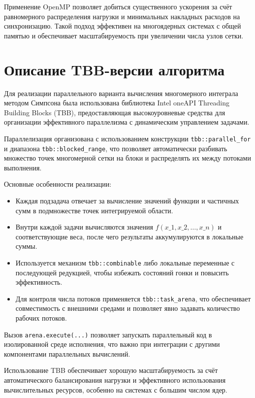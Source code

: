 \documentclass[14pt,a4paper]{extarticle}
\begin{document}
Применение OpenMP позволяет добиться существенного ускорения за счёт равномерного распределения нагрузки и минимальных накладных расходов на синхронизацию. Такой подход эффективен на многоядерных системах с общей памятью и обеспечивает масштабируемость при увеличении числа узлов сетки.


\section{Описание TBB-версии алгоритма}

Для реализации параллельного варианта вычисления многомерного интеграла методом Симпсона была использована библиотека Intel oneAPI Threading Building Blocks (TBB), предоставляющая высокоуровневые средства для организации эффективного параллелизма с динамическим управлением задачами.

Параллелизация организована с использованием конструкции \texttt{tbb::parallel\_for} и диапазона \texttt{tbb::blocked\_range}, что позволяет автоматически разбивать множество точек многомерной сетки на блоки и распределять их между потоками выполнения.

Основные особенности реализации:

\begin{itemize}
    \item Каждая подзадача отвечает за вычисление значений функции и частичных сумм в подмножестве точек интегрируемой области.
    
    \item Внутри каждой задачи вычисляются значения $f(x\_1, x\_2, \dots, x\_n)$ и соответствующие веса, после чего результаты аккумулируются в локальные суммы.
    
    \item Используется механизм \texttt{tbb::combinable} либо локальные переменные с последующей редукцией, чтобы избежать состояний гонки и повысить эффективность.
    
    \item Для контроля числа потоков применяется \texttt{tbb::task\_arena}, что обеспечивает совместимость с внешними средами и позволяет явно задавать количество рабочих потоков.
\end{itemize}

Вызов \texttt{arena.execute(...)} позволяет запускать параллельный код в изолированной среде исполнения, что важно при интеграции с другими компонентами параллельных вычислений.

Использование TBB обеспечивает хорошую масштабируемость за счёт автоматического балансирования нагрузки и эффективного использования вычислительных ресурсов, особенно на системах с большим числом ядер.
\end{document}
